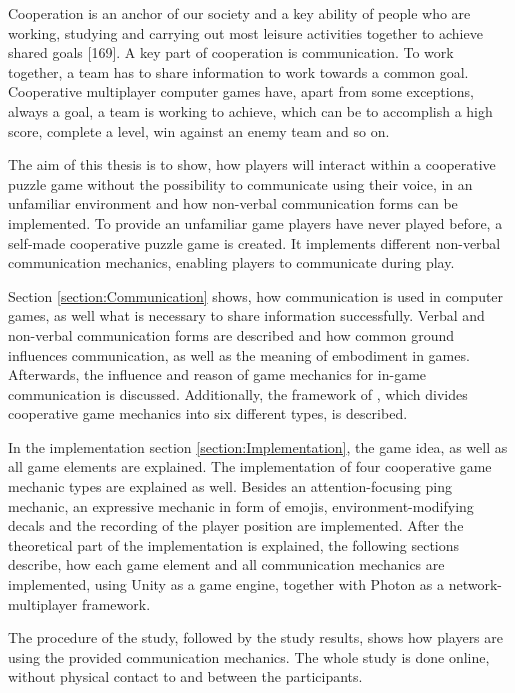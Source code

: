 Cooperation is an anchor of our society and a key ability of people who are working, studying and carrying out most leisure activities together to achieve shared goals \autocite{Morschheuser2017HowGame}[169]. A key part of cooperation is communication. To work together, a team has to share information to work towards a common goal.
Cooperative multiplayer computer games have, apart from some exceptions, always a goal, a team is working to achieve, which can be to accomplish a high score, complete a level, win against an enemy team and so on.

The aim of this thesis is to show, how players will interact within a cooperative puzzle game without the possibility to communicate using their voice, in an unfamiliar environment and how non-verbal communication forms can be implemented. 
To provide an unfamiliar game players have never played before, a self-made cooperative puzzle game is created. It implements different non-verbal communication mechanics, enabling players to communicate during play.

Section \ref{section:Communication} shows, how communication is used in computer games, as well what is necessary to share information successfully. Verbal and non-verbal communication forms are described and how common ground influences communication, as well as the meaning of embodiment in games.
Afterwards, the influence and reason of game mechanics for in-game communication is discussed. Additionally, the framework of \textcite{Toups2014ATheory}, which divides cooperative game mechanics into six different types, is described.

In the implementation section \ref{section:Implementation}, the game idea, as well as all game elements are explained. 
The implementation of four cooperative game mechanic types are explained as well. Besides an attention-focusing ping mechanic, an expressive mechanic in form of emojis, environment-modifying decals and the recording of the player position are implemented.
After the theoretical part of the implementation is explained, the following sections describe, how each game element and all communication mechanics are implemented, using Unity as a game engine, together with Photon as a network-multiplayer framework.

The procedure of the study, followed by the study results, shows how players are using the provided communication mechanics. The whole study is done online, without physical contact to and between the participants.